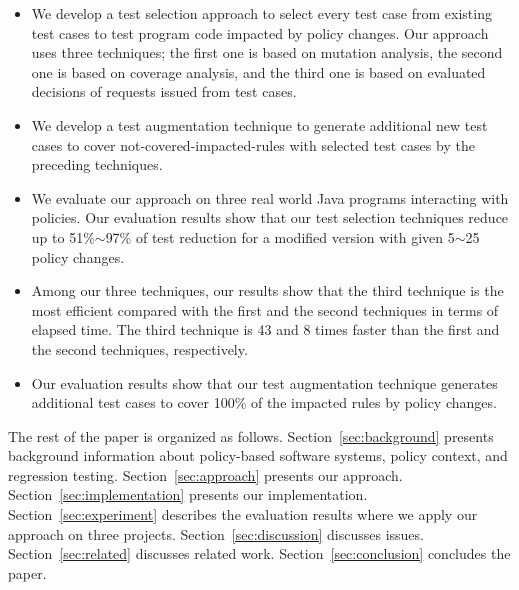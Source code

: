 \begin{itemize}
  \item We develop a test selection approach to select every test case from existing test cases to test program code impacted by policy changes. Our approach
  uses three techniques; the first one is based on mutation analysis, the second one is based on coverage analysis, and the third one is based on evaluated 
decisions of requests issued from test cases. 
  \item We develop a test augmentation technique to generate additional new test cases to cover not-covered-impacted-rules with selected test cases by the preceding techniques.

  \item We evaluate our approach on three real world Java programs interacting with policies. Our evaluation results show that our test selection techniques reduce up to 51\%$\sim$97\% of test reduction for a modified version with given 5$\sim$25 policy changes.
  

  \item Among our three techniques, our results show that the third technique is the most efficient compared with the first
  and the second techniques in terms of elapsed time. The third technique is 43 and 8 times
faster than the first and the second techniques, respectively.
  
  \item Our evaluation results show that our test augmentation technique generates additional test cases to cover 100\% of the impacted rules by policy changes.
\end{itemize}

The rest of the paper is organized as follows.
Section~\ref{sec:background} presents background information about
policy-based software systems, policy context, and regression testing.
Section~\ref{sec:approach} presents our approach.
Section~\ref{sec:implementation} presents our implementation. 
Section~\ref{sec:experiment} describes the evaluation results
where we apply our approach on three projects.
Section~\ref{sec:discussion} discusses issues. 
Section~\ref{sec:related} discusses related
work. Section~\ref{sec:conclusion}
concludes the paper.